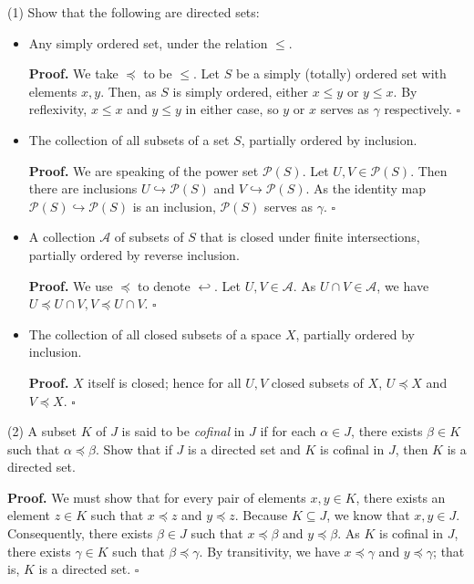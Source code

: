\documentclass[a4paper]{article}
\begin{document}
(1) Show that the following are directed sets:
\begin{itemize}
    \item Any simply ordered set, under the relation $\leq$.
    
    \textbf{Proof.} We take $\preceq$ to be $\leq$. Let $S$ be a simply (totally) ordered set with elements $x, y$. Then, as $S$ is simply ordered, either $x \leq y$ or $y \leq x$. By reflexivity, $x \leq x$ and $y \leq y$ in either case, so $y$ or $x$ serves as $\gamma$ respectively. $\square$

    \item The collection of all subsets of a set $S$, partially ordered by inclusion.
    
    \textbf{Proof.} We are speaking of the power set $\mathcal{P}(S)$. Let $U, V \in \mathcal{P}(S)$. Then there are inclusions $U \hookrightarrow \mathcal{P}(S)$ and $V \hookrightarrow \mathcal{P}(S)$. As the identity map $\mathcal{P}(S) \hookrightarrow \mathcal{P}(S)$ is an inclusion, $\mathcal{P}(S)$ serves as $\gamma$. $\square$

    \item A collection $\mathscr{A}$ of subsets of $S$ that is closed under finite intersections, partially ordered by reverse inclusion.
    
    \textbf{Proof.} We use $\preceq$ to denote $\hookleftarrow$. Let $U, V \in \mathscr{A}$. As $U \cap V \in \mathscr{A}$, we have $U \preceq U \cap V, V \preceq U \cap V$. $\square$

    \item The collection of all closed subsets of a space $X$, partially ordered by inclusion.
    
    \textbf{Proof.} $X$ itself is closed; hence for all $U, V$ closed subsets of $X$, $U \preceq X$ and $V \preceq X$. $\square$
\end{itemize}

(2) A subset $K$ of $J$ is said to be \emph{cofinal} in $J$ if for each $\alpha \in J$, there exists $\beta \in K$ such that $\alpha \preceq \beta$. Show that if $J$ is a directed set and $K$ is cofinal in $J$, then $K$ is a directed set.

\textbf{Proof.} We must show that for every pair of elements $x, y \in K$, there exists an element $z \in K$ such that $x \preceq z$ and $y \preceq z$. Because $K \subseteq J$, we know that $x, y \in J$. Consequently, there exists $\beta \in J$ such that $x \preceq \beta$ and $y \preceq \beta$. As $K$ is cofinal in $J$, there exists $\gamma \in K$ such that $\beta \preceq \gamma$. By transitivity, we have $x \preceq \gamma$ and $y \preceq \gamma$; that is, $K$ is a directed set. $\square$
\end{document}
